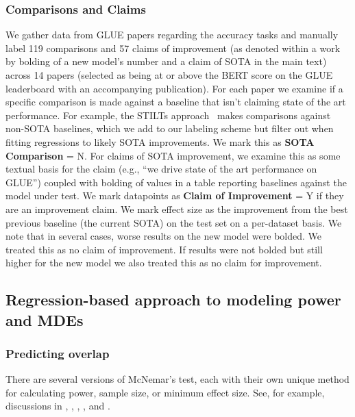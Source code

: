 \documentclass[11pt,a4paper]{article}
\begin{document}
\subsubsection{Comparisons and Claims}

We gather data from GLUE papers regarding the accuracy tasks and manually label 119 comparisons and 57 claims of improvement (as denoted within a work by bolding of a new model's number and a claim of SOTA in the main text) across 14 papers (selected as being at or above the BERT score on the GLUE leaderboard with an accompanying publication). For each paper we examine if a specific comparison is made against a baseline that isn't claiming state of the art performance. For example, the STILTs approach~\citep{phang2018sentence} makes comparisons against non-SOTA baselines, which we add to our labeling scheme but filter out when fitting regressions to likely SOTA improvements. We mark this as \textbf{SOTA Comparison} = N. For claims of SOTA improvement, we examine this as some textual basis for the claim (e.g., ``we drive state of the art performance on GLUE'') coupled with bolding of values in a table reporting baselines against the model under test. We mark datapoints as \textbf{Claim of Improvement} = Y if they are an improvement claim. We mark effect size as the improvement from the best previous baseline (the current SOTA) on the test set on a per-dataset basis. We note that in several cases, worse results on the new model were bolded. We treated this as no claim of improvement. If results were not bolded but still higher for the new model we also treated this as no claim for improvement. 

\subsection{Regression-based approach to modeling power and MDEs} \label{app:regressions}

\subsubsection{Predicting overlap}
\label{app:overlap}


There are several versions of McNemar's test, each with their own unique method for calculating power, sample size, or minimum effect size. See, for example, discussions in \citet{schlesselman1982case}, \citet{duffy1984asymptotic} \citet{suissa19912}, \citet{connett1987sample}, \citet{fagerland2013mcnemar}, and \citet{lachenbruch1992sample}.
\end{document}
